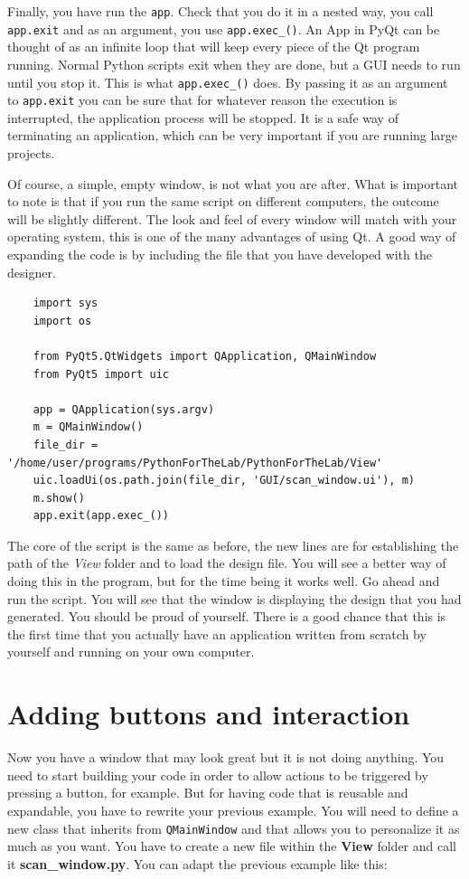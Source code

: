 Finally, you have run the \texttt{app}. Check that you do it in a nested
way, you call \texttt{app.exit} and as an argument, you use
\texttt{app.exec_()}. An App in PyQt can be thought of as an infinite
loop that will keep every piece of the Qt program running. Normal Python
scripts exit when they are done, but a {GUI} needs to run until you stop
it. This is what \texttt{app.exec_()} does. By passing it as an
argument to \texttt{app.exit} you can be sure that for whatever reason
the execution is interrupted, the application process will be stopped.
It is a safe way of terminating an application, which can be very
important if you are running large projects.

Of course, a simple, empty window, is not what you are after. What is
important to note is that if you run the same script on different
computers, the outcome will be slightly different. The look and feel of
every window will match with your operating system, this is one of the
many advantages of using Qt. A good way of expanding the code is by
including the file that you have developed with the designer.

\begin{verbatim}
    import sys
    import os

    from PyQt5.QtWidgets import QApplication, QMainWindow
    from PyQt5 import uic

    app = QApplication(sys.argv)
    m = QMainWindow()
    file_dir = '/home/user/programs/PythonForTheLab/PythonForTheLab/View'
    uic.loadUi(os.path.join(file_dir, 'GUI/scan_window.ui'), m)
    m.show()
    app.exit(app.exec_())
\end{verbatim}

The core of the script is the same as before, the new lines are for
establishing the path of the \emph{View} folder and to load the design
file. You will see a better way of doing this in the program, but for
the time being it works well. Go ahead and run the script. You will see
that the window is displaying the design that you had generated. You
should be proud of yourself. There is a good chance that this is the
first time that you actually have an application written from scratch by
yourself and running on your own computer.


\section{Adding buttons and interaction}\label{adding-buttons-andinteraction}
Now you have a window that may look great but it is not doing anything.
You need to start building your code in order to allow actions to be
triggered by pressing a button, for example. But for having code that
is reusable and expandable, you have to rewrite your previous example.
You will need to define a new class that inherits from
\texttt{QMainWindow} and that allows you to personalize it as much as
you want. You have to create a new file within the \textbf{View} folder
and call it \textbf{scan\_window.py}. You can adapt the previous example
like this:

